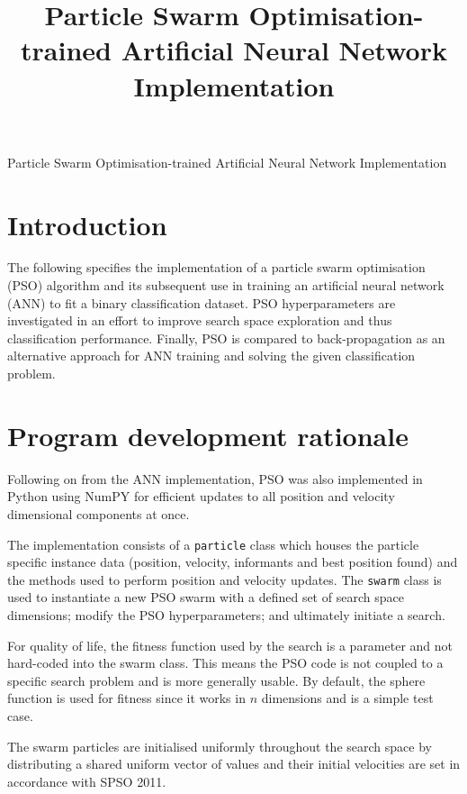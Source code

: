 \documentclass[12pt]{article}
\begin{document}
\title{Particle Swarm Optimisation-trained Artificial Neural Network Implementation}

\begin{center}
  \Large{Particle Swarm Optimisation-trained Artificial Neural Network Implementation}
\end{center}

\vspace{-2em}
\section{Introduction}

The following specifies the implementation of a particle swarm
optimisation (PSO) algorithm and its subsequent use in training an
artificial neural network (ANN) to fit a binary classification dataset.
PSO hyperparameters are investigated in an effort to improve search
space exploration and thus classification performance. Finally, PSO is compared to back-propagation as an alternative approach for ANN training and solving the given classification problem.

\vspace{-1.5em}
\section{Program development rationale}

Following on from the ANN implementation, PSO was also implemented in
Python using NumPY for efficient updates to all position and velocity
dimensional components at once.

The implementation consists of a \texttt{particle} class which houses the
particle specific instance data (position, velocity, informants and best position found) and the
methods used to perform position and velocity updates. The \texttt{swarm}
class is used to instantiate a new PSO swarm with a defined set of search space
dimensions; modify the PSO hyperparameters; and ultimately initiate a search.

For quality of life, the fitness function used by the search is a parameter
and not hard-coded into the swarm class. This means the PSO code is not coupled
to a specific search problem and is more generally usable. By default,
the sphere function is used for fitness since it works in \(n\) dimensions
and is a simple test case.

The swarm particles are initialised uniformly throughout the search space
by distributing a shared uniform vector of values and their initial velocities
are set in accordance with SPSO 2011. \cite{Clerc}
\end{document}
